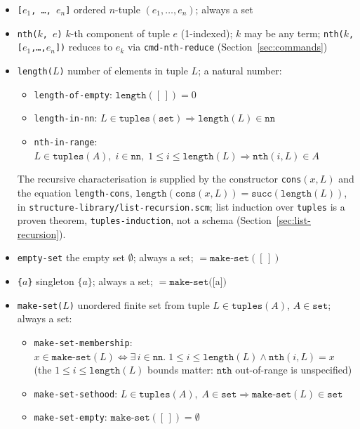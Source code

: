 \begin{itemize}
\item \texttt{[$e_1$, \ldots, $e_n$]} ordered $n$-tuple $(e_1, \ldots, e_n)$; always a set
\item \texttt{nth($k$, $e$)} $k$-th component of tuple $e$ (1-indexed); $k$ may be any term;
  \texttt{nth($k$, [$e_1$,\ldots,$e_n$])} reduces to $e_k$ via
  \texttt{cmd-nth-reduce} (Section~\ref{sec:commands})
\item \texttt{length($L$)} number of elements in tuple $L$; a natural number:
  \begin{itemize}
  \item \texttt{length-of-empty}: $\texttt{length}([\,]) = 0$
  \item \texttt{length-in-nn}: $L \in \mathtt{tuples}(\mathtt{set}) \Rightarrow
    \texttt{length}(L) \in \mathtt{nn}$
  \item \texttt{nth-in-range}: $L \in \mathtt{tuples}(A),\; i \in \mathtt{nn},\;
    1 \le i \le \texttt{length}(L) \Rightarrow \texttt{nth}(i,L) \in A$
  \end{itemize}
  The recursive characterisation is supplied by the constructor
  \texttt{cons}$(x,L)$ and the equation \texttt{length-cons},
  $\texttt{length}(\texttt{cons}(x,L)) = \texttt{succ}(\texttt{length}(L))$,
  in \texttt{structure-library/list-recursion.scm}; list induction over
  \texttt{tuples} is a proven theorem, \texttt{tuples-induction}, not a schema
  (Section~\ref{sec:list-recursion}).
\item \texttt{empty-set} the empty set $\emptyset$; always a set; $= \texttt{make-set}([\,])$
\item \texttt{\{$a$\}} singleton $\{a\}$; always a set; $= \texttt{make-set}([$a$])$
\item \texttt{make-set($L$)} unordered finite set from tuple $L \in \mathtt{tuples}(A)$,
  $A \in \mathtt{set}$; always a set:
  \begin{itemize}
  \item \texttt{make-set-membership}: $x \in \texttt{make-set}(L)
    \Longleftrightarrow \exists\,i \in \mathtt{nn}.\;
    1 \le i \le \texttt{length}(L) \land \texttt{nth}(i,L) = x$
    (the $1 \le i \le \texttt{length}(L)$ bounds matter:
    $\texttt{nth}$ out-of-range is unspecified)
  \item \texttt{make-set-sethood}: $L \in \mathtt{tuples}(A),\; A \in \mathtt{set}
    \Rightarrow \texttt{make-set}(L) \in \mathtt{set}$
  \item \texttt{make-set-empty}: $\texttt{make-set}([\,]) = \emptyset$

\end{itemize}
\end{itemize}
